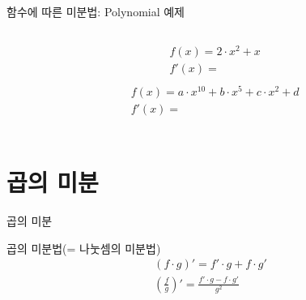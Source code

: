 \documentclass[aspectratio=169]{beamer}
\begin{document}
\begin{frame}{함수에 따른 미분법: Polynomial 예제}
  \begin{columns}
    \begin{column}{.5\textwidth}
      \begin{align*}
        & f(x) = 2 \cdot x^2 + x  \\
        & f'(x) = \\
      \end{align*}
      \begin{align*}
        & f(x) = a \cdot x^{10} + b \cdot x^5 + c \cdot x^2 + d\\
        & f'(x) = \\
      \end{align*}    
    \end{column}
  \end{columns}
\end{frame}






\section{곱의 미분}

\begin{frame}{곱의 미분}
  \begin{block}{곱의 미분법(= 나눗셈의 미분법)}
    \begin{align*}
      (f \cdot g)' = f' \cdot g + f \cdot g' \\
      \left(\frac{f}{g} \right)' = \frac{f' \cdot g - f \cdot g'}{g^2}
    \end{align*}
  \end{block}
\end{frame}
\end{document}
